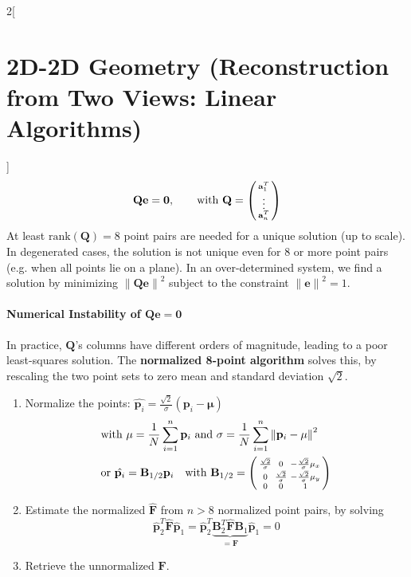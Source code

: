 \documentclass[oneside,fontsize=11pt,paper=a4]{scrartcl}
\newcommand\norm[1]{\left\lVert#1\right\rVert}
\begin{document}
\begin{multicols}{2}[\section{2D-2D Geometry (Reconstruction from Two Views: Linear Algorithms)}]
\begin{equation*}
    \mathbf{Q} \mathbf{e} = \mathbf{0}, \quad\quad \text{with } \mathbf{Q} = \begin{psmallmatrix}
        \mathbf{a}^T_1 \\ 
        \vdots \\
        \mathbf{a}^T_n
    \end{psmallmatrix} 
\end{equation*}
At least  $\text{rank}(\mathbf{Q}) = 8$ point pairs are needed for a unique solution (up to scale). In degenerated cases, the solution is not unique even for 8 or more point pairs (e.g. when all points lie on a plane). In an over-determined system, we find a solution by minimizing $\norm{\mathbf{Qe}}^2$ subject to the constraint $\norm{\mathbf{e}}^2=1$.

\paragraph{Numerical Instability of $\mathbf{Q} \mathbf{e} = \mathbf{0}$} In practice, $\mathbf{Q}$'s columns have different orders of magnitude, leading to a poor least-squares solution. The \textbf{normalized 8-point algorithm} solves this, by rescaling the two point sets to zero mean and standard deviation $\sqrt{2}$.

\begin{enumerate}
    \item Normalize the points: $\hat{\mathbf{p}_i}=\frac{\sqrt{2}}{\sigma}(\mathbf{p}_i-\mathbf{\mu})$
    $$\begin{aligned}  &\text{with } \mathbf{\mu} = \frac{1}{N}\sum^n_{i=1}\mathbf{p}_i \text{ and } \sigma = \frac{1}{N}\sum^n_{i=1}\norm{\mathbf{p}_i-\mathbf{\mu}}^2
    \\  
    &\text{or }\hat{\mathbf{p}_i}=\mathbf{B}_{1/2}\mathbf{p}_i\quad\text{with } \mathbf{B}_{1/2} = \begin{psmallmatrix}
        \frac{\sqrt{2}}{\sigma} & 0 & -\frac{\sqrt{2}}{\sigma}\mu_x \\
        0 & \frac{\sqrt{2}}{\sigma} & -\frac{\sqrt{2}}{\sigma}\mu_y \\
        0 & 0 & 1
    \end{psmallmatrix}
    \end{aligned}$$
    \item Estimate the normalized $\hat{\mathbf{F}}$ from $n>8$ normalized point pairs, by solving
    $$\mathbf{\hat{p}}^T_2\mathbf{\hat{F}}\mathbf{\hat{p}}_1 = \mathbf{\hat{p}}^T_2\underbrace{\mathbf{B}^T_2\mathbf{\hat{F}}\mathbf{B}_1}_{=\mathbf{F}}\mathbf{\hat{p}}_1 = 0$$
    \item Retrieve the unnormalized $\mathbf{F}$.
\end{enumerate}



\end{multicols}
\end{document}
